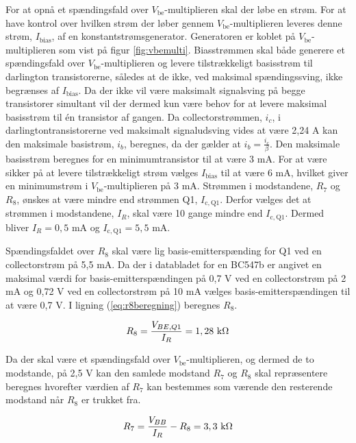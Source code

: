 For at opnå et spændingsfald over $V_\mathrm{be}$-multiplieren skal der løbe en strøm. For at have kontrol over hvilken strøm der løber gennem $V_\mathrm{be}$-multiplieren leveres denne strøm,  $I_\mathrm{bias}$, af en konstantstrømsgenerator. Generatoren er koblet på $V_\mathrm{be}$-multiplieren som vist på figur \ref{fig:vbemulti}. Biasstrømmen skal både generere et spændingsfald over $V_\mathrm{be}$-multiplieren og levere tilstrækkeligt basisstrøm til darlington transistorerne, således at de ikke, ved maksimal spændingssving, ikke begrænses af $I_\mathrm{bias}$. Da der ikke vil være maksimalt signalsving på begge transistorer simultant vil der dermed kun være behov for at levere maksimal basisstrøm til én transistor af gangen. Da collectorstrømmen, $i_c$, i darlingtontransistorerne ved maksimalt signaludsving vides at være 2,24 A kan den maksimale basistrøm, $i_b$, beregnes, da der gælder at $i_b = \frac{i_c}{\beta}$. Den maksimale basisstrøm beregnes for en minimumtransistor til at være 3 mA. For at være sikker på at levere tilstrækkeligt strøm vælges $I_\mathrm{bias}$ til at være 6 mA, hvilket giver en minimumstrøm i $V_\mathrm{be}$-multiplieren på 3 mA. Strømmen i modstandene, $R_7$ og $R_8$, ønskes at være mindre end strømmen Q1,  $I_\mathrm{c,Q1}$. Derfor vælges det at strømmen i modstandene,  $I_R$, skal være 10 gange mindre end $I_\mathrm{c,Q1}$. Dermed bliver $I_R = 0,5$ mA og $I_\mathrm{c,Q1} = 5,5$ mA.

Spændingsfaldet over $R_8$ skal være lig basis-emitterspænding for Q1 ved en collectorstrøm på 5,5 mA. Da der i databladet for en BC547b er angivet en maksimal værdi for basis-emitterspændingen på 0,7 V ved en collectorstrøm på 2 mA og 0,72 V ved en collectorstrøm på 10 mA vælges basis-emitterspændingen til at være 0,7 V. I ligning (\ref{eq:r8beregning}) beregnes $R_8$.

\begin{equation}
R_8 = \frac{V_{BE,Q1}}{I_R} = 1,28~\mathrm{k}\ohm
\label{eq:r8beregning}
\end{equation}

Da der skal være et spændingsfald over $V_\mathrm{be}$-multiplieren, og dermed de to modstande, på 2,5 V kan den samlede modstand $R_7$ og $R_8$ skal repræsentere beregnes hvorefter værdien af $R_7$ kan bestemmes som værende den resterende modstand når $R_8$ er trukket fra.

\begin{equation}
R_7 = \frac{V_{BB}}{I_R} - R_8 = 3,3~\mathrm{k}\ohm
\label{eq:r7beregning}
\end{equation}

